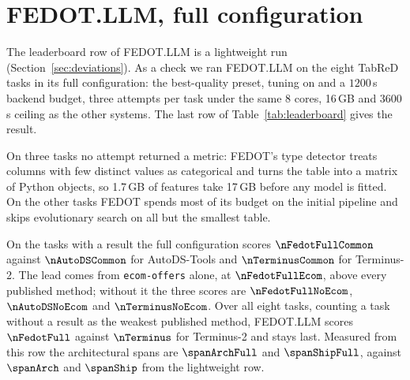 \appendix


\section{FEDOT.LLM, full configuration}
\label{app:fedot}

\begin{sloppypar}
The leaderboard row of FEDOT.LLM is a lightweight run
(Section~\ref{sec:deviations}). As a check we ran FEDOT.LLM on the eight TabReD
tasks in its full configuration: the best-quality preset, tuning on and a
$1200$\,s backend budget, three attempts per task under the same 8 cores,
16\,GB and $3600$\,s ceiling as the other systems. The last row of
Table~\ref{tab:leaderboard} gives the result.
\end{sloppypar}

On three tasks no attempt returned a metric: FEDOT's type detector treats
columns with few distinct values as categorical and turns the table into a
matrix of Python objects, so 1.7\,GB of features take 17\,GB before any model
is fitted. On the other tasks FEDOT spends most of its budget on the initial
pipeline and skips evolutionary search on all but the smallest table.

On the \fedotFullTasks{} tasks with a result the full configuration scores
$\nFedotFullCommon$ against $\nAutoDSCommon$ for AutoDS-Tools and
$\nTerminusCommon$ for Terminus-2. The lead comes from \texttt{ecom-offers} alone, at $\nFedotFullEcom$, above
every published method; without it the three scores are $\nFedotFullNoEcom$,
$\nAutoDSNoEcom$ and $\nTerminusNoEcom$. Over all eight tasks, counting a task without a result as the weakest published method,
FEDOT.LLM scores $\nFedotFull$ against $\nTerminus$ for Terminus-2 and stays
last. Measured from this row the architectural spans are $\spanArchFull$ and
$\spanShipFull$, against $\spanArch$ and $\spanShip$ from the lightweight row.
